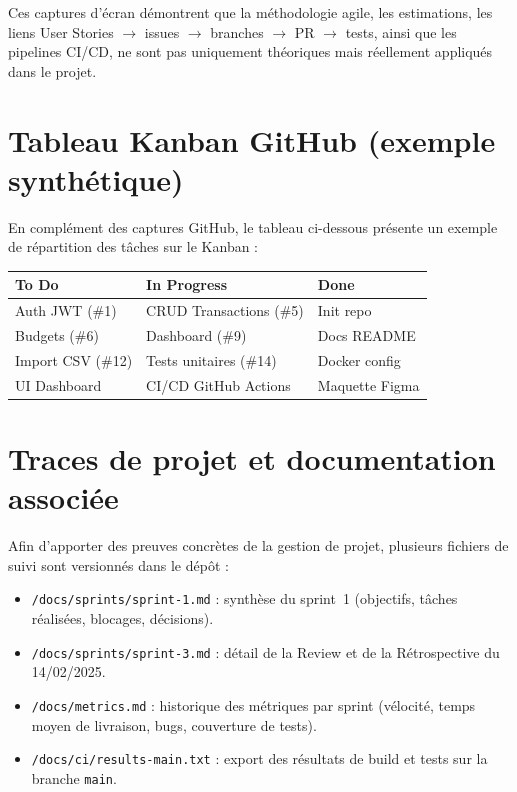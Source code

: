 Ces captures d’écran démontrent que la méthodologie agile, les estimations, les liens User Stories $\rightarrow$ issues $\rightarrow$ branches $\rightarrow$ PR $\rightarrow$ tests, ainsi que les pipelines CI/CD, ne sont pas uniquement théoriques mais réellement appliqués dans le projet.

\section{Tableau Kanban GitHub (exemple synthétique)}

En complément des captures GitHub, le tableau ci-dessous présente un exemple de répartition des tâches sur le Kanban :

\begin{center}
\begin{tabular}{|p{4cm}|p{4cm}|p{4cm}|}
\hline
\textbf{To Do} & \textbf{In Progress} & \textbf{Done} \\
\hline
Auth JWT (\#1) & CRUD Transactions (\#5) & Init repo \\
Budgets (\#6) & Dashboard (\#9) & Docs README \\
Import CSV (\#12) & Tests unitaires (\#14) & Docker config \\
UI Dashboard & CI/CD GitHub Actions & Maquette Figma \\
\hline
\end{tabular}
\end{center}

\section{Traces de projet et documentation associée}

Afin d’apporter des preuves concrètes de la gestion de projet, plusieurs fichiers de suivi sont versionnés dans le dépôt :

\begin{itemize}
    \item \texttt{/docs/sprints/sprint-1.md} : synthèse du sprint~1 (objectifs, tâches réalisées, blocages, décisions).
    \item \texttt{/docs/sprints/sprint-3.md} : détail de la Review et de la Rétrospective du 14/02/2025.
    \item \texttt{/docs/metrics.md} : historique des métriques par sprint (vélocité, temps moyen de livraison, bugs, couverture de tests).
    \item \texttt{/docs/ci/results-main.txt} : export des résultats de build et tests sur la branche \texttt{main}.
\end{itemize}

